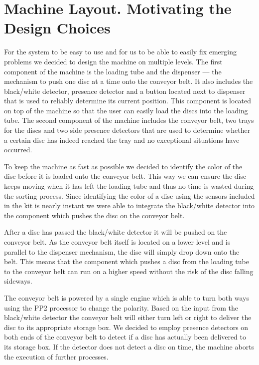 \documentclass[a4paper,oneside,11pt]{report}
\begin{document}
\section{Machine Layout. Motivating the Design Choices}
For the system to be easy to use and for us to be able to easily fix emerging problems we decided to design the machine on multiple levels. The first component of the machine is the loading tube and the dispenser --- the mechanism to push one disc at a time onto the conveyor belt. It also includes the black/white detector, presence detector and a button located next to dispenser that is used to reliably determine its current position. This component is located on top of the machine so that the user can easily load the discs into the loading tube. The second component of the machine includes the conveyor belt, two trays for the discs and two side presence detectors that are used to determine whether a certain disc has indeed reached the tray and no exceptional situations have occurred.

To keep the machine as fast as possible we decided to identify the color of the disc before it is loaded onto the conveyor belt. This way we can ensure the disc keeps moving when it has left the loading tube and thus no time is wasted during the sorting process. Since identifying the color of a disc using the sensors included in the kit is nearly instant we were able to integrate the black/white detector into the component which pushes the disc on the conveyor belt.

After a disc has passed the black/white detector it will be pushed on the conveyor belt. As the conveyor belt itself is located on a lower level and is parallel to the dispenser mechanism, the disc will simply drop down onto the belt. This means that the component which pushes a disc from the loading tube to the conveyor belt can run on a higher speed without the risk of the disc falling sideways.

The conveyor belt is powered by a single engine which is able to turn both ways using the PP2 processor to change the polarity. Based on the input from the black/white detector the conveyor belt will either turn left or right to deliver the disc to its appropriate storage box. We decided to employ presence detectors on both ends of the conveyor belt to detect if a disc has actually been delivered to its storage box. If the detector does not detect a disc on time, the machine aborts the execution of further processes.

\newpage
\end{document}
